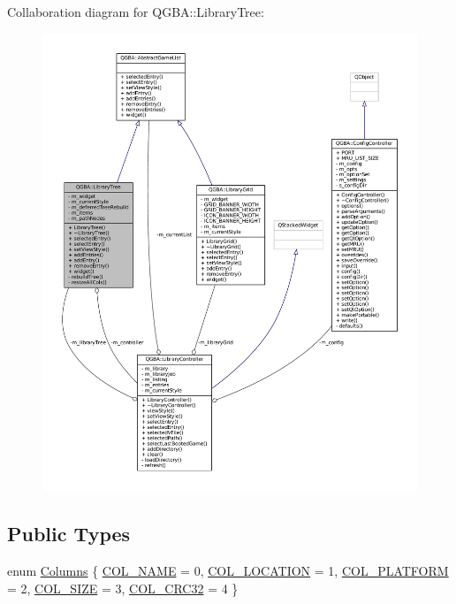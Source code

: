 Collaboration diagram for Q\+G\+BA\+:\+:Library\+Tree\+:
\nopagebreak
\begin{figure}[H]
\begin{center}
\leavevmode
\includegraphics[width=350pt]{class_q_g_b_a_1_1_library_tree__coll__graph}
\end{center}
\end{figure}
\subsection*{Public Types}
\begin{DoxyCompactItemize}
\item 
enum \mbox{\hyperlink{class_q_g_b_a_1_1_library_tree_a019d167b263ccb0a08d0be54a13f11e3}{Columns}} \{ \newline
\mbox{\hyperlink{class_q_g_b_a_1_1_library_tree_a019d167b263ccb0a08d0be54a13f11e3a16ce9c5f99617bd18761d6cca9a696a5}{C\+O\+L\+\_\+\+N\+A\+ME}} = 0, 
\mbox{\hyperlink{class_q_g_b_a_1_1_library_tree_a019d167b263ccb0a08d0be54a13f11e3a47c161448baa27081c4df6571daad2fa}{C\+O\+L\+\_\+\+L\+O\+C\+A\+T\+I\+ON}} = 1, 
\mbox{\hyperlink{class_q_g_b_a_1_1_library_tree_a019d167b263ccb0a08d0be54a13f11e3ad76b3bd08bbecd26cfde87ad85598c4c}{C\+O\+L\+\_\+\+P\+L\+A\+T\+F\+O\+RM}} = 2, 
\mbox{\hyperlink{class_q_g_b_a_1_1_library_tree_a019d167b263ccb0a08d0be54a13f11e3a28a9e02f2f60b2c9fd0e8a654073fea3}{C\+O\+L\+\_\+\+S\+I\+ZE}} = 3, 
\newline
\mbox{\hyperlink{class_q_g_b_a_1_1_library_tree_a019d167b263ccb0a08d0be54a13f11e3a54b6d0bab5b54918e9a18d9ffd1c3ac1}{C\+O\+L\+\_\+\+C\+R\+C32}} = 4
 \}
\end{DoxyCompactItemize}
